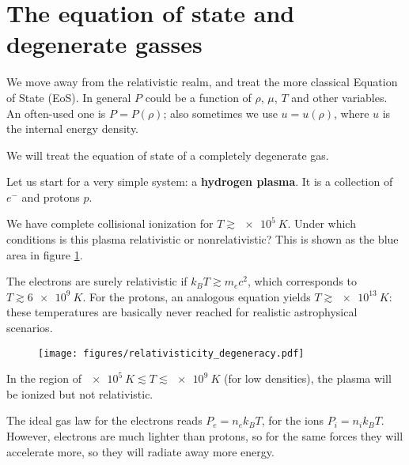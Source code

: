 \documentclass[main.tex]{subfiles}
\begin{document}
\section{The equation of state and degenerate gasses}




We move away from the relativistic realm, and treat the more classical Equation of State (EoS). 
In general \(P\) could be a function of \(\rho \), \(\mu \), \(T\) and other variables. 
An often-used one is \(P = P (\rho )\); also sometimes we use \(u = u(\rho )\), where \(u\) is the internal energy density. 

We will treat the equation of state of a completely degenerate gas. 

Let us start for a very simple system: a \textbf{hydrogen plasma}. 
It is a collection of \(e^{-}\) and protons \(p\). 

We have complete collisional ionization for \(T \gtrsim \SI{e5}{K}\). 
Under which conditions is this plasma relativistic or nonrelativistic? This is shown as the blue area in figure \ref{fig:relativisticity_degeneracy}.

The electrons are surely relativistic if \(k_B T \gtrsim m_e c^2\), which corresponds to \(T \gtrsim \SI{6e9}{K}\). 
For the protons, an analogous equation yields \(T \gtrsim \SI{e13}{K}\): these temperatures are basically never reached for realistic astrophysical scenarios. 

\begin{figure}[ht]
\centering
\texttt{[image: figures/relativisticity\_degeneracy.pdf]}
\caption{}
\label{fig:relativisticity_degeneracy}
\end{figure}

In the region of \(\SI{e5}{K} \lesssim T \lesssim \SI{e9}{K}\) (for low densities), the plasma will be ionized but not relativistic. 

The ideal gas law for the electrons reads \(P_e = n_e k_B T\), for the ions \(P_i = n_i k_B T\). 
However, electrons are much lighter than protons, so for the same forces they will accelerate more, so they will radiate away more energy. 
\end{document}
